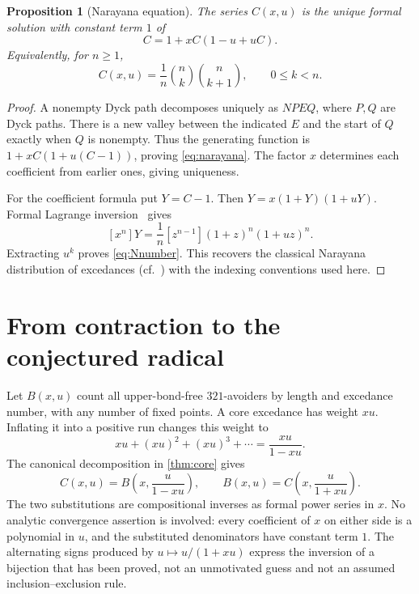 \documentclass[11pt,letterpaper]{article}
\numberwithin{equation}{section}
\newtheorem{proposition}[theorem]{Proposition}
\theoremstyle{definition}
\newcommand{\coeff}[2]{[#1^{#2}]}
\begin{document}
\begin{proposition}[Narayana equation]
\label{prop:narayana}
The series $C(x,u)$ is the unique formal solution with constant term $1$
of
\begin{equation}
 C=1+xC(1-u+uC).
 \label{eq:narayana}
\end{equation}
Equivalently, for $n\ge1$,
\begin{equation}
 \coeff{x}{n}\coeff{u}{k}C(x,u)
   =\frac1n\binom nk\binom n{k+1},\qquad 0\le k<n.
 \label{eq:Nnumber}
\end{equation}
\end{proposition}
\begin{proof}
A nonempty Dyck path decomposes uniquely as $NPEQ$, where $P,Q$ are
Dyck paths. There is a new valley between the indicated $E$ and the
start of $Q$ exactly when $Q$ is nonempty. Thus the generating function
is $1+xC(1+u(C-1))$, proving \eqref{eq:narayana}. The factor $x$ determines
each coefficient from earlier ones, giving uniqueness.

For the coefficient formula put $Y=C-1$. Then
$Y=x(1+Y)(1+uY)$. Formal Lagrange inversion~\cite{flajolet-sedgewick} gives
\[
 \coeff{x}{n}Y=\frac1n\coeff{z}{n-1}(1+z)^n(1+uz)^n.
\]
Extracting $u^k$ proves \eqref{eq:Nnumber}. This recovers the classical
Narayana distribution of excedances (cf.\ \cite[Corollary 3.7]{reifegerste})
with the indexing conventions used here.
\end{proof}

\section{From contraction to the conjectured radical}
\label{sec:proof}

Let $B(x,u)$ count all upper-bond-free $321$-avoiders by length and
excedance number, with any number of fixed points. A core excedance
has weight $xu$. Inflating it into a positive run changes this weight to
\[
 xu+(xu)^2+(xu)^3+\cdots=\frac{xu}{1-xu}.
\]
The canonical decomposition in \cref{thm:core} gives
\begin{equation}
 C(x,u)=B\!\left(x,\frac{u}{1-xu}\right),\qquad
 \boxed{B(x,u)=C\!\left(x,\frac{u}{1+xu}\right).}
 \label{eq:substitution}
\end{equation}
The two substitutions are compositional inverses as formal power
series in $x$. No analytic convergence assertion is involved: every
coefficient of $x$ on either side is a polynomial in $u$, and the
substituted denominators have constant term $1$. The alternating signs
produced by $u\mapsto u/(1+xu)$ express the inversion of a bijection that
has been proved, not an unmotivated guess and not an assumed
inclusion--exclusion rule.
\end{document}
